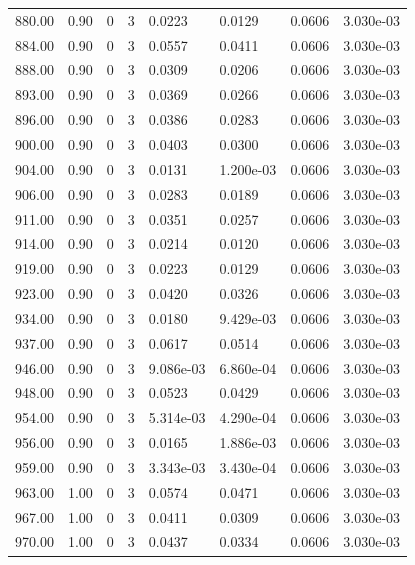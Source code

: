 \documentclass[preview]{standalone}
\begin{document}
{{{{{{\begin{tabular}{L{1.2cm}C{1.2cm} C{0.3cm}C{0.5cm} C{1.4cm}C{1.4cm} C{1.4cm}C{1.4cm}}
  880.00  &  0.90  & 0     &  3 &  0.0223  & 0.0129  & 0.0606 &  3.030e-03   \\ 
  884.00  &  0.90  & 0     &  3 &  0.0557  & 0.0411  & 0.0606 &  3.030e-03   \\ 
  888.00  &  0.90  & 0     &  3 &  0.0309  & 0.0206  & 0.0606 &  3.030e-03   \\ 
  893.00  &  0.90  & 0     &  3 &  0.0369  & 0.0266  & 0.0606 &  3.030e-03   \\ 
  896.00  &  0.90  & 0     &  3 &  0.0386  & 0.0283  & 0.0606 &  3.030e-03   \\ 
  900.00  &  0.90  & 0     &  3 &  0.0403  & 0.0300  & 0.0606 &  3.030e-03   \\ 
  904.00  &  0.90  & 0     &  3 &  0.0131  & 1.200e-03  & 0.0606 &  3.030e-03   \\ 
  906.00  &  0.90  & 0     &  3 &  0.0283  & 0.0189  & 0.0606 &  3.030e-03   \\ 
  911.00  &  0.90  & 0     &  3 &  0.0351  & 0.0257  & 0.0606 &  3.030e-03   \\ 
  914.00  &  0.90  & 0     &  3 &  0.0214  & 0.0120  & 0.0606 &  3.030e-03   \\ 
  919.00  &  0.90  & 0     &  3 &  0.0223  & 0.0129  & 0.0606 &  3.030e-03   \\ 
  923.00  &  0.90  & 0     &  3 &  0.0420  & 0.0326  & 0.0606 &  3.030e-03   \\ 
  934.00  &  0.90  & 0     &  3 &  0.0180  & 9.429e-03  & 0.0606 &  3.030e-03   \\ 
  937.00  &  0.90  & 0     &  3 &  0.0617  & 0.0514  & 0.0606 &  3.030e-03   \\ 
  946.00  &  0.90  & 0     &  3 &  9.086e-03  & 6.860e-04  & 0.0606 &  3.030e-03   \\ 
  948.00  &  0.90  & 0     &  3 &  0.0523  & 0.0429  & 0.0606 &  3.030e-03   \\ 
  954.00  &  0.90  & 0     &  3 &  5.314e-03  & 4.290e-04  & 0.0606 &  3.030e-03   \\ 
  956.00  &  0.90  & 0     &  3 &  0.0165  & 1.886e-03  & 0.0606 &  3.030e-03   \\ 
  959.00  &  0.90  & 0     &  3 &  3.343e-03  & 3.430e-04  & 0.0606 &  3.030e-03   \\ 
  963.00  &  1.00  & 0     &  3 &  0.0574  & 0.0471  & 0.0606 &  3.030e-03   \\ 
  967.00  &  1.00  & 0     &  3 &  0.0411  & 0.0309  & 0.0606 &  3.030e-03   \\ 
  970.00  &  1.00  & 0     &  3 &  0.0437  & 0.0334  & 0.0606 &  3.030e-03   \\ 

\end{tabular}}}}}}}
\end{document}
